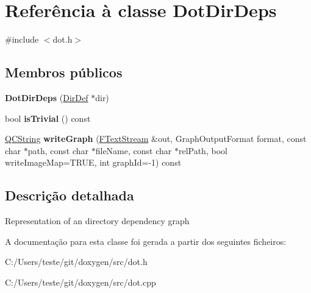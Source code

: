 \hypertarget{class_dot_dir_deps}{\section{Referência à classe Dot\-Dir\-Deps}
\label{class_dot_dir_deps}
}


{\ttfamily \#include $<$dot.\-h$>$}

\subsection*{Membros públicos}
\begin{DoxyCompactItemize}
\item 
\hypertarget{class_dot_dir_deps_a0acf1197384f7e360280c1a187501f6b}{{\bfseries Dot\-Dir\-Deps} (\hyperlink{class_dir_def}{Dir\-Def} $\ast$dir)}\label{class_dot_dir_deps_a0acf1197384f7e360280c1a187501f6b}

\item 
\hypertarget{class_dot_dir_deps_a3359ce63bc7239a94a35485704af1993}{bool {\bfseries is\-Trivial} () const }\label{class_dot_dir_deps_a3359ce63bc7239a94a35485704af1993}

\item 
\hypertarget{class_dot_dir_deps_aecb89fe622864fe35a4da24c4e3d9564}{\hyperlink{class_q_c_string}{Q\-C\-String} {\bfseries write\-Graph} (\hyperlink{class_f_text_stream}{F\-Text\-Stream} \&out, Graph\-Output\-Format format, const char $\ast$path, const char $\ast$file\-Name, const char $\ast$rel\-Path, bool write\-Image\-Map=T\-R\-U\-E, int graph\-Id=-\/1) const }\label{class_dot_dir_deps_aecb89fe622864fe35a4da24c4e3d9564}

\end{DoxyCompactItemize}


\subsection{Descrição detalhada}
Representation of an directory dependency graph 

A documentação para esta classe foi gerada a partir dos seguintes ficheiros\-:\begin{DoxyCompactItemize}
\item 
C\-:/\-Users/teste/git/doxygen/src/dot.\-h\item 
C\-:/\-Users/teste/git/doxygen/src/dot.\-cpp\end{DoxyCompactItemize}
